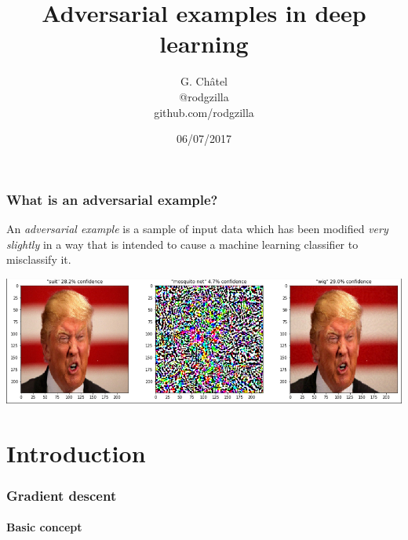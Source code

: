 \documentclass[9pt]{beamer}
\title{Adversarial examples in deep learning}
\author[G. Châtel]{G. Châtel\\@rodgzilla\\github.com/rodgzilla}
\date{06/07/2017}
\begin{document}

\begin{frame}

  \maketitle

\end{frame}

\begin{frame}
  \frametitle{What is an adversarial example?}

  An \emph{adversarial example} is a sample of input data which has
  been modified \emph{very slightly} in a way that is intended to
  cause a machine learning classifier to misclassify it.

  \bigskip

  \pause

  \begin{center}
    \includegraphics[trim={2pt 2pt 2pt 0}, clip, width =
      \linewidth]{images/adversarial_example_wig.png}
  \end{center}

\end{frame}

\section{Introduction}

\begin{frame}
  \frametitle{Gradient descent}

  \framesubtitle{Basic concept}

  \begin{center}
    \scalebox{0.8}{
      
    }
  \end{center}

\end{frame}
\end{document}
